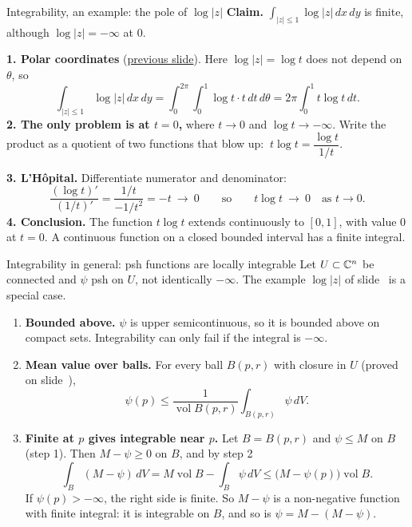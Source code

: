 \begin{frame}{Integrability, an example: the pole of \(\log|z|\)}
\label{fr:log-pole}
\textbf{Claim.} \(\int_{|z|\le1}\log|z|\,dx\,dy\) is finite, although \(\log|z|=-\infty\) at \(0\).
\par
\textbf{1. Polar coordinates} (\hyperlink{fr:polar-coordinates-dx-dy-38}{previous slide}). Here \(\log|z|=\log t\) does not depend on \(\theta\), so
\[
\int_{|z|\le1}\log|z|\,dx\,dy=\int_0^{2\pi}\!\!\int_0^1\log t\cdot t\,dt\,d\theta=2\pi\int_0^1t\log t\,dt .
\]
\textbf{2. The only problem is at \(t=0\),} where \(t\to0\) and \(\log t\to-\infty\). Write the product as a quotient of two functions that blow up:
\(\ t\log t=\dfrac{\log t}{1/t}\).
\par
\textbf{3. L'Hôpital.} Differentiate numerator and denominator:
\[
\frac{(\log t)'}{(1/t)'}=\frac{1/t}{-1/t^2}=-t\ \longrightarrow\ 0
\qquad\text{so}\qquad
t\log t\ \longrightarrow\ 0\quad\text{as } t\to0 .
\]
\textbf{4. Conclusion.} The function \(t\log t\) extends continuously to \([0,1]\), with value \(0\) at \(t=0\). A continuous function on a closed bounded interval has a finite integral.
\end{frame}

\begin{frame}{Integrability in general: psh functions are locally integrable}
\label{fr:psh-integrable}
Let \(U\subset\mathbb C^n\) be connected and \(\psi\) psh on \(U\), not identically \(-\infty\). The example \(\log|z|\) of slide~\hyperlink{fr:log-pole}{\pageref{fr:log-pole}} is a special case.
\begin{enumerate}
\item \textbf{Bounded above.} \(\psi\) is upper semicontinuous, so it is bounded above on compact sets. Integrability can only fail if the integral is \(-\infty\).
\item \textbf{Mean value over balls.} For every ball \(B(p,r)\) with closure in \(U\) (proved on slide~\hyperlink{fr:psh-ball-mean}{\pageref{fr:psh-ball-mean}}),
\[
\psi(p)\le\frac{1}{\operatorname{vol}B(p,r)}\int_{B(p,r)}\psi\,dV.
\]
\item \textbf{Finite at \(p\) gives integrable near \(p\).} Let \(B=B(p,r)\) and \(\psi\le M\) on \(B\) (step 1). Then \(M-\psi\ge0\) on \(B\), and by step 2
\[
\int_B(M-\psi)\,dV=M\operatorname{vol}B-\int_B\psi\,dV\le\bigl(M-\psi(p)\bigr)\operatorname{vol}B .
\]
If \(\psi(p)>-\infty\), the right side is finite. So \(M-\psi\) is a non-negative function with finite integral: it is integrable on \(B\), and so is \(\psi=M-(M-\psi)\).
\end{enumerate}
\end{frame}

